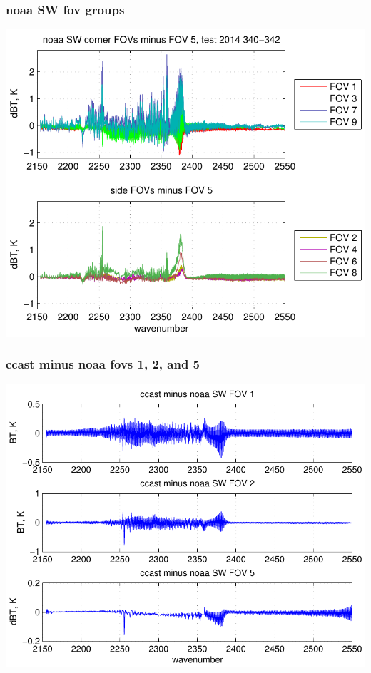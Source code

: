 \documentclass[11pt]{beamer}
\begin{document}
\begin{frame}
\frametitle{noaa SW fov groups}

\begin{center}
  \includegraphics[scale=0.7]{figures/noaa_SW_dif_2014_340-342.pdf}
\end{center}

\end{frame}
\begin{frame}
\frametitle{ccast minus noaa fovs 1, 2, and 5}

\begin{center}
  \includegraphics[scale=0.7]{figures/ccast_noaa_SW_fig_1.pdf}
\end{center}

\end{frame}
\end{document}
